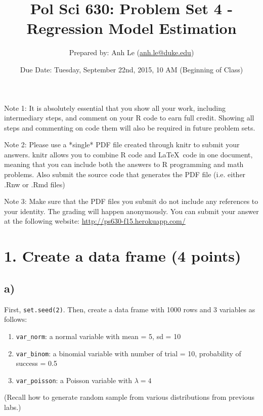 \documentclass{article}\usepackage[]{graphicx}\usepackage[]{color}
\begin{document}
\title{Pol Sci 630: Problem Set 4 - Regression Model Estimation}

\author{Prepared by: Anh Le (\href{mailto:anh.le@duke.edu}{anh.le@duke.edu})}

\date{Due Date: Tuesday, September 22nd, 2015, 10 AM (Beginning of Class)}

\maketitle

Note 1: It is absolutely essential that you show all your work, including intermediary steps, and comment on your R code to earn full credit. Showing all steps and commenting on code them will also be required in future problem sets.

Note 2: Please use a *single* PDF file created through knitr to submit your answers. knitr allows you to combine R code and \LaTeX \ code in one document, meaning that you can include both the answers to R programming and math problems. Also submit the source code that generates the PDF file (i.e. either .Rnw or .Rmd files)

Note 3: Make sure that the PDF files you submit do not include any references to your identity. The grading will happen anonymously. You can submit your answer at the following website: \url{http://ps630-f15.herokuapp.com/}

\section*{1. Create a data frame (4 points)}

\subsection*{a)}
First, \verb`set.seed(2)`. Then, create a data frame with 1000 rows and 3 variables as follows:
\begin{enumerate}
\item \verb`var_norm`: a normal variable with mean = 5, sd = 10
\item \verb`var_binom`: a binomial variable with number of trial = 10, probability of success = 0.5
\item \verb`var_poisson`: a Poisson variable with $\lambda = 4$
\end{enumerate}

(Recall how to generate random sample from various distributions from previous labs.)
\end{document}
